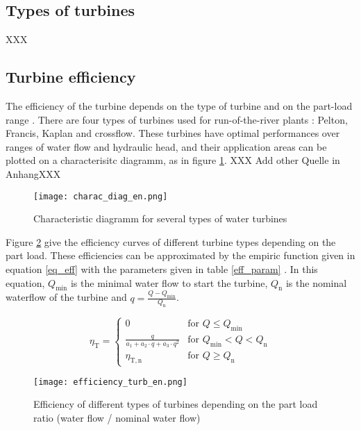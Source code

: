 \subsection{Types of turbines}

XXX

\subsection{Turbine efficiency}

The efficiency of the turbine depends on the type of turbine and on the part-load range \cite{quaschning}\cite{pacer}. There are four types of turbines used for run-of-the-river plants : Pelton, Francis, Kaplan and crossflow. These turbines have optimal performances over ranges of water flow and hydraulic head, and their application areas can be plotted on a characterisitc diagramm, as in figure \ref{charac_diag}. XXX Add other Quelle in AnhangXXX

\begin{figure}[H]
\texttt{[image: charac\_diag\_en.png]}
\caption[Characteristic diagramm for several types of water turbines]{Characteristic diagramm for several types of water turbines \cite{wiki_WK}}
\centering
\label{charac_diag}
\end{figure}

Figure \ref{efficiency_turb} give the efficiency curves of different turbine types depending on the part load. These efficiencies can be approximated by the empiric function given in equation \ref{eq_eff} with the parameters given in table \ref{eff_param} \cite{quaschning}. In this equation, $Q_\mathrm{min}$ is the minimal water flow to start the turbine, $Q_\mathrm{n}$ is the nominal waterflow of the turbine and $q=\frac{Q-Q_\mathrm{min}}{Q_\mathrm{n}}$.

\begin{equation}
 \label{eq_eff}
\eta_\mathrm{T}= \left\{
    \begin{array}{ll}
	0 & \mbox{for } Q \leq Q_\mathrm{min}\\
        \frac{q}{a_\mathrm{1}+a_\mathrm{2} \cdot q + a_\mathrm{3} \cdot q^2} & \mbox{for } Q_\mathrm{min}<Q<Q_\mathrm{n} \\
        \eta_\mathrm{T,n} & \mbox{for } Q \geq Q_\mathrm{n}
    \end{array}
\right.
\end{equation}


\begin{figure}[H]
\texttt{[image: efficiency\_turb\_en.png]}
\caption[Efficiency of different types of turbines depending on the part load ratio]{Efficiency of different types of turbines depending on the part load ratio (water flow / nominal water flow) \cite{raa89}}
\centering
\label{efficiency_turb}
\end{figure}


